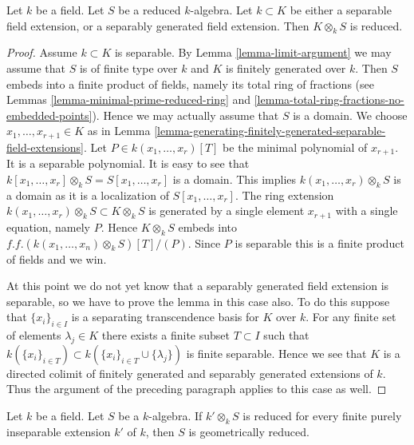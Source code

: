 \begin{lemma}
\label{lemma-separable-extension-preserves-reducedness}
Let $k$ be a field.
Let $S$ be a reduced $k$-algebra.
Let $k \subset K$ be either a separable field extension,
or a separably generated field extension.
Then $K \otimes_k S$ is reduced.
\end{lemma}

\begin{proof}
Assume $k \subset K$ is separable.
By Lemma \ref{lemma-limit-argument}
we may assume that $S$ is of finite type over $k$
and $K$ is finitely generated over $k$.
Then $S$ embeds into a finite product of fields,
namely its total ring of fractions (see
Lemmas \ref{lemma-minimal-prime-reduced-ring} and
\ref{lemma-total-ring-fractions-no-embedded-points}).
Hence we may actually assume that $S$ is a domain.
We choose $x_1, \ldots, x_{r + 1} \in K$ as in
Lemma \ref{lemma-generating-finitely-generated-separable-field-extensions}.
Let $P \in k(x_1, \ldots, x_r)[T]$
be the minimal polynomial of $x_{r + 1}$. It is a separable polynomial.
It is easy to see that
$k[x_1, \ldots, x_r] \otimes_k S = S[x_1, \ldots, x_r]$ is a domain.
This implies $k(x_1, \ldots, x_r) \otimes_k S$ is a domain
as it is a localization of $S[x_1, \ldots, x_r]$.
The ring extension $k(x_1, \ldots, x_r) \otimes_k S \subset K \otimes_k S$
is generated by a single element $x_{r + 1}$ with a single
equation, namely $P$. Hence $K \otimes_k S$ embeds into
$f.f.(k(x_1, \ldots, x_n) \otimes_k S)[T]/(P)$.
Since $P$ is separable this is a finite product of fields and we win.

\medskip\noindent
At this point we do not yet know that a separably generated field
extension is separable, so we have to prove the lemma in this case also.
To do this suppose that $\{x_i\}_{i \in I}$ is a separating
transcendence basis for $K$ over $k$. For any finite set of elements
$\lambda_j \in K$ there exists a finite subset $T \subset I$ such
that $k(\{x_i\}_{i\in T}) \subset k(\{x_i\}_{i \in T} \cup \{\lambda_j\})$
is finite separable. Hence we see that $K$ is a directed colimit of
finitely generated and separably generated extensions of $k$. Thus
the argument of the preceding paragraph applies to this case as well.
\end{proof}

\begin{lemma}
\label{lemma-geometrically-reduced-finite-purely-inseparable-extension}
Let $k$ be a field. Let $S$ be a $k$-algebra.
If $k' \otimes_k S$ is reduced for every finite
purely inseparable extension $k'$ of $k$, then
$S$ is geometrically reduced.
\end{lemma}


